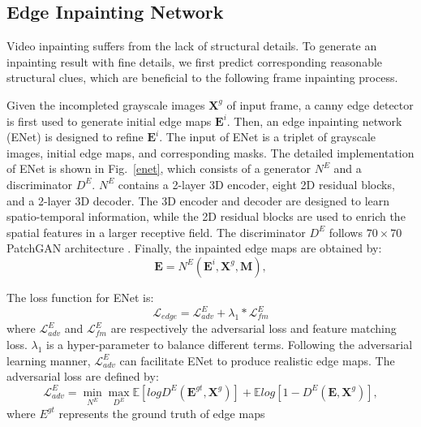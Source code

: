 \subsection{Edge Inpainting Network}
Video inpainting suffers from the lack of structural details.
To generate an inpainting result with fine details, we first predict corresponding reasonable structural clues, which are beneficial to the following frame inpainting process.

Given the incompleted grayscale images $\boldsymbol{X}^{g}$ of input frame, a canny edge detector is first used to generate initial edge maps $\boldsymbol{E}^{i}$. 
Then, an edge inpainting network (ENet) is designed to refine $\boldsymbol{E}^{i}$.
The input of ENet is a triplet of grayscale images, initial edge maps, and corresponding masks. 
The detailed implementation of ENet is shown in Fig.~\ref{enet}, which consists of a generator $N^E$ and a discriminator $D^E$.
$N^E$ contains a 2-layer 3D encoder, eight 2D residual blocks, and a 2-layer 3D decoder. The 3D encoder and decoder are designed to learn spatio-temporal information, while the 2D residual blocks are used to enrich the spatial features in a larger receptive field. The discriminator $D^E$ follows $70\times 70$ PatchGAN architecture \cite{Isola_2017_CVPR}.
Finally, the inpainted edge maps are obtained by:
\begin{equation}
\label{eq:edgenet}
\boldsymbol{E}=N^E(\boldsymbol{E}^{i},\boldsymbol{X}^{g},\boldsymbol{M}),
\end{equation}

The loss function for ENet is:
\begin{equation}
\label{eq:loss_e}
\mathcal{L}_{edge}=\mathcal{L}^E_{adv}+\lambda_1 * \mathcal{L}^E_{fm}
\end{equation}
where $\mathcal{L}^E_{adv}$ and $\mathcal{L}^E_{fm}$ are respectively the adversarial loss and feature matching loss. 
$\lambda_1$ is a hyper-parameter to balance different terms.
Following the adversarial learning manner, $\mathcal{L}^E_{adv}$ can facilitate ENet to produce realistic edge maps. The adversarial loss are defined by:
\begin{equation}
\label{eq:edge_adver}
\mathcal{L}^E_{adv}=\min\limits_{N^E} \max \limits_{D^E}\mathbb{E}[logD^E(\boldsymbol{E}^{gt},\boldsymbol{X}^{g})]+\mathbb{E}log[1-D^E(\boldsymbol{E},\boldsymbol{X}^{g})],
\end{equation}
where $E^{gt}$ represents the ground truth of edge maps 

